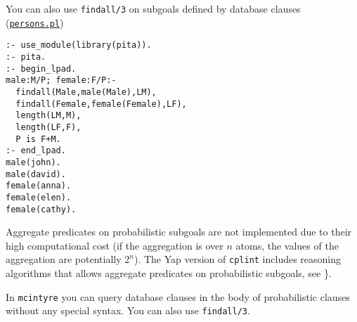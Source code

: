 You can also use \verb|findall/3| on subgoals defined by database clauses
(\href{http://cplint.lamping.unife.it/example/inference/persons.pl}{\texttt{persons.pl}})
\begin{verbatim}
:- use_module(library(pita)).
:- pita.
:- begin_lpad.
male:M/P; female:F/P:-
  findall(Male,male(Male),LM),
  findall(Female,female(Female),LF),
  length(LM,M),
  length(LF,F),
  P is F+M.
:- end_lpad.
male(john).
male(david).
female(anna).
female(elen).
female(cathy).
\end{verbatim}
Aggregate predicates on probabilistic subgoals are not implemented due to their high
computational cost (if the aggregation is over $n$ atoms, the values of the
aggregation are potentially $2^n$). The Yap version of \verb|cplint| includes
reasoning algorithms that allows aggregate predicates on probabilistic subgoals,
see \}.

In \verb|mcintyre| you can query database clauses in the body of probabilistic clauses without any special syntax. You can also 
use \verb|findall/3|.